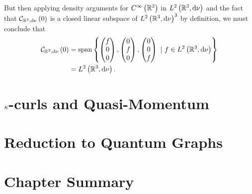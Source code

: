 But then applying density arguments for $C^{\infty}\left( \mathbb{R}^3 \right)$ in $L^{2}\left( \mathbb{R}^3,\mathrm{d}\nu \right)$ and the fact that $\mathcal{C}_{ \mathbb{R}^3, \mathrm{d}\nu}\left( 0 \right)$ is a closed linear subspace of $L^{2}\left( \mathbb{R}^3,\mathrm{d}\nu \right)^3$ by definition, we must conclude that
\begin{align*}
	\mathcal{C}_{ \mathbb{R}^3, \mathrm{d}\nu}\left( 0 \right) &= \mathrm{span}\left\{ 	
	\begin{pmatrix}	f \\ 0 \\ 0	\end{pmatrix},
	\begin{pmatrix}	0 \\ f \\ 0	\end{pmatrix},
	\begin{pmatrix}	0 \\ 0 \\ f	\end{pmatrix}
	\ \vert \ f\in L^{2}\left( \mathbb{R}^3,\mathrm{d}\nu \right)
	 \right\} \\
	&= L^{2}\left( \mathbb{R}^3,\mathrm{d}\nu \right).
\end{align*}

\section{$\kappa$-curls and Quasi-Momentum} \label{sec:kCurlsAndQM}

\section{Reduction to Quantum Graphs} \label{sec:CurlReductionToQG}

\section{Chapter Summary} \label{sec:CurlSummary}


